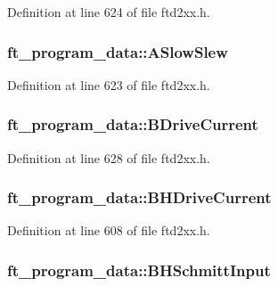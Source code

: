Definition at line 624 of file ftd2xx.h.\hypertarget{structft__program__data_ac9bd84862d8950749f28dde07688a2dd}{
\subsubsection[{ASlowSlew}]{ {\bf ft\_\-program\_\-data::ASlowSlew}}}
\label{structft__program__data_ac9bd84862d8950749f28dde07688a2dd}


Definition at line 623 of file ftd2xx.h.\hypertarget{structft__program__data_a09d5d7234d1be0ac5d30a0a215dfd717}{
\subsubsection[{BDriveCurrent}]{ {\bf ft\_\-program\_\-data::BDriveCurrent}}}
\label{structft__program__data_a09d5d7234d1be0ac5d30a0a215dfd717}


Definition at line 628 of file ftd2xx.h.\hypertarget{structft__program__data_ab24662f43f4fc1c442baf82feccfe045}{
\subsubsection[{BHDriveCurrent}]{ {\bf ft\_\-program\_\-data::BHDriveCurrent}}}
\label{structft__program__data_ab24662f43f4fc1c442baf82feccfe045}


Definition at line 608 of file ftd2xx.h.\hypertarget{structft__program__data_ac8225d9a9c8e12cde47c1d7d99c9eb4c}{
\subsubsection[{BHSchmittInput}]{ {\bf ft\_\-program\_\-data::BHSchmittInput}}}
\label{structft__program__data_ac8225d9a9c8e12cde47c1d7d99c9eb4c}


